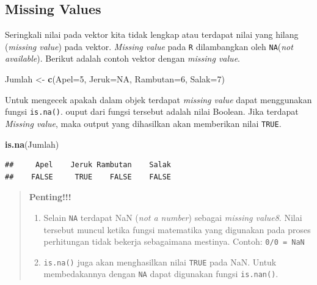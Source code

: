 \documentclass[]{book}
\newenvironment{Shaded}{\begin{snugshade}}{\end{snugshade}}
\newcommand{\DataTypeTok}[1]{\textcolor[rgb]{0.13,0.29,0.53}{#1}}
\newcommand{\DecValTok}[1]{\textcolor[rgb]{0.00,0.00,0.81}{#1}}
\newcommand{\KeywordTok}[1]{\textcolor[rgb]{0.13,0.29,0.53}{\textbf{#1}}}
\newcommand{\NormalTok}[1]{#1}
\newcommand{\OtherTok}[1]{\textcolor[rgb]{0.56,0.35,0.01}{#1}}
\newcommand{\StringTok}[1]{\textcolor[rgb]{0.31,0.60,0.02}{#1}}
\providecommand{\tightlist}{%
  \setlength{\itemsep}{0pt}\setlength{\parskip}{0pt}}
\theoremstyle{definition}
\theoremstyle{definition}
\theoremstyle{definition}
\theoremstyle{remark}
\begin{document}
\hypertarget{missingvalue}{%
\subsection{Missing Values}\label{missingvalue}}

Seringkali nilai pada vektor kita tidak lengkap atau terdapat nilai yang hilang (\emph{missing value}) pada vektor. \emph{Missing value} pada \texttt{R} dilambangkan oleh \texttt{NA}(\emph{not available}). Berikut adalah contoh vektor dengan \emph{missing value}.

\begin{Shaded}
\begin{Highlighting}[]
\NormalTok{Jumlah <-}\StringTok{ }\KeywordTok{c}\NormalTok{(}\DataTypeTok{Apel=}\DecValTok{5}\NormalTok{, }\DataTypeTok{Jeruk=}\OtherTok{NA}\NormalTok{, }\DataTypeTok{Rambutan=}\DecValTok{6}\NormalTok{, }\DataTypeTok{Salak=}\DecValTok{7}\NormalTok{)}
\end{Highlighting}
\end{Shaded}

Untuk mengecek apakah dalam objek terdapat \emph{missing value} dapat menggunakan fungsi \texttt{is.na()}. ouput dari fungsi tersebut adalah nilai Boolean. Jika terdapat \emph{Missing value}, maka output yang dihasilkan akan memberikan nilai \texttt{TRUE}.

\begin{Shaded}
\begin{Highlighting}[]
\KeywordTok{is.na}\NormalTok{(Jumlah)}
\end{Highlighting}
\end{Shaded}

\begin{verbatim}
##     Apel    Jeruk Rambutan    Salak 
##    FALSE     TRUE    FALSE    FALSE
\end{verbatim}

\begin{quote}
\textbf{Penting!!!}

\begin{enumerate}
\def\labelenumi{\arabic{enumi}.}
\tightlist
\item
  Selain \texttt{NA} terdapat NaN (\emph{not a number}) sebagai \emph{missing value8}. Nilai tersebut muncul ketika fungsi matematika yang digunakan pada proses perhitungan tidak bekerja sebagaimana mestinya. Contoh: \texttt{0/0\ =\ NaN}
\item
  \texttt{is.na()} juga akan menghasilkan nilai \texttt{TRUE} pada NaN. Untuk membedakannya dengan \texttt{NA} dapat digunakan fungsi \texttt{is.nan()}.
\end{enumerate}
\end{quote}
\end{document}
